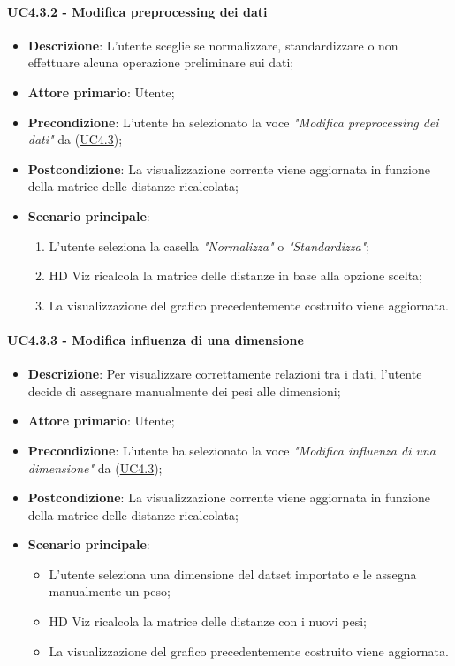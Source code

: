 \paragraph{UC4.3.2 - Modifica preprocessing dei dati}
\label{par:uc4.3.2}
\begin{itemize}
    \item \textbf{Descrizione}: L’utente sceglie se normalizzare, standardizzare o non effettuare alcuna operazione preliminare sui dati;

    \item \textbf{Attore primario}: Utente;
    \item \textbf{Precondizione}: L'utente ha selezionato la voce \emph{"Modifica preprocessing dei dati"} da (\hyperref[ssub:uc4.3]{UC4.3});
    \item \textbf{Postcondizione}: La visualizzazione corrente viene aggiornata in funzione della matrice delle distanze ricalcolata;
    \item \textbf{Scenario principale}:
    \begin{enumerate}
        \item L'utente seleziona la casella \emph{"Normalizza"} o \emph{"Standardizza"};
        \item HD Viz ricalcola la matrice delle distanze in base alla opzione scelta;
        \item La visualizzazione del grafico precedentemente costruito viene aggiornata.
    \end{enumerate}
\end{itemize}

\paragraph{UC4.3.3 - Modifica influenza di una dimensione}
\label{par:uc4.3.3}
\begin{itemize}
    \item \textbf{Descrizione}: Per visualizzare correttamente relazioni tra i dati,
                                l’utente decide di assegnare manualmente dei pesi alle dimensioni;

    \item \textbf{Attore primario}: Utente;
    \item \textbf{Precondizione}: L'utente ha selezionato la voce \emph{"Modifica influenza di una dimensione"} da (\hyperref[ssub:uc4.3]{UC4.3});

    \item \textbf{Postcondizione}: La visualizzazione corrente viene aggiornata in funzione della matrice delle distanze ricalcolata;
    \item \textbf{Scenario principale}:
    \begin{itemize}
        \item L’utente seleziona una dimensione del datset importato e le assegna manualmente un peso;
        \item HD Viz ricalcola la matrice delle distanze con i nuovi pesi;
        \item La visualizzazione del grafico precedentemente costruito viene aggiornata.
    \end{itemize}
\end{itemize}

